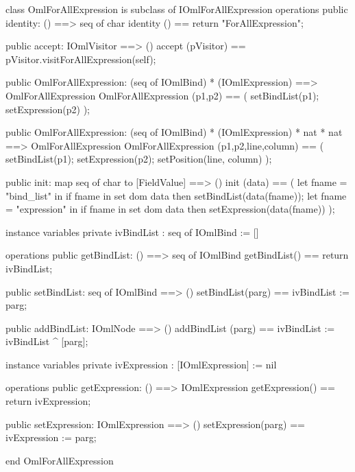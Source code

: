 \begin{vdm_al}
class OmlForAllExpression is subclass of IOmlForAllExpression
operations
  public identity: () ==> seq of char
  identity () == return "ForAllExpression";

  public accept: IOmlVisitor ==> ()
  accept (pVisitor) == pVisitor.visitForAllExpression(self);

  public OmlForAllExpression:
    (seq of IOmlBind) *
    (IOmlExpression) ==> OmlForAllExpression
  OmlForAllExpression (p1,p2) == 
    ( setBindList(p1);
      setExpression(p2) );

  public OmlForAllExpression:
    (seq of IOmlBind) *
    (IOmlExpression) *
    nat *
    nat ==> OmlForAllExpression
  OmlForAllExpression (p1,p2,line,column) == 
    ( setBindList(p1);
      setExpression(p2);
      setPosition(line, column) );

  public init: map seq of char to [FieldValue] ==> ()
  init (data) ==
    ( let fname = "bind_list" in
        if fname in set dom data
        then setBindList(data(fname));
      let fname = "expression" in
        if fname in set dom data
        then setExpression(data(fname)) );

instance variables
  private ivBindList : seq of IOmlBind := []

operations
  public getBindList: () ==> seq of IOmlBind
  getBindList() == return ivBindList;

  public setBindList: seq of IOmlBind ==> ()
  setBindList(parg) == ivBindList := parg;

  public addBindList: IOmlNode ==> ()
  addBindList (parg) == ivBindList := ivBindList ^ [parg];

instance variables
  private ivExpression : [IOmlExpression] := nil

operations
  public getExpression: () ==> IOmlExpression
  getExpression() == return ivExpression;

  public setExpression: IOmlExpression ==> ()
  setExpression(parg) == ivExpression := parg;

end OmlForAllExpression
\end{vdm_al}

